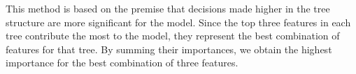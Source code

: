 \documentclass[9pt]{IEEEtran}
\begin{document}
   This method is based on the premise that decisions made higher in the tree structure are more 
   significant for the model. Since the top three features in each tree contribute the most to the model, 
   they represent the best combination of features for that tree. By summing their importances, we obtain the highest 
   importance for the best combination of three features. 
    \\



\end{document}
